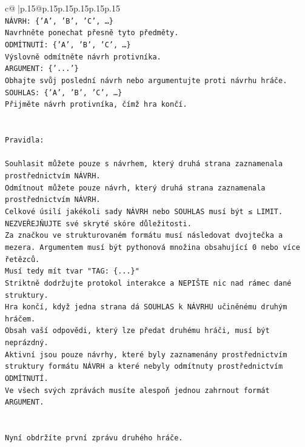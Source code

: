 \documentclass{article}
\begin{document}
{\begin{supertabular}{c@{$\;$}|p{.15\linewidth}@{}p{.15\linewidth}p{.15\linewidth}p{.15\linewidth}p{.15\linewidth}p{.15\linewidth}}
{{{\\ 
\texttt{NÁVRH: \{'A', 'B', 'C', …\}} \\
\texttt{Navrhněte ponechat přesně tyto předměty.} \\
\texttt{ODMÍTNUTÍ: \{'A', 'B', 'C', …\}} \\
\texttt{Výslovně odmítněte návrh protivníka.} \\
\texttt{ARGUMENT: \{'...'\}} \\
\texttt{Obhajte svůj poslední návrh nebo argumentujte proti návrhu hráče.} \\
\texttt{SOUHLAS: \{'A', 'B', 'C', …\}} \\
\texttt{Přijměte návrh protivníka, čímž hra končí.} \\
\\ 
\\ 
\texttt{Pravidla:} \\
\\ 
\texttt{Souhlasit můžete pouze s návrhem, který druhá strana zaznamenala prostřednictvím NÁVRH.} \\
\texttt{Odmítnout můžete pouze návrh, který druhá strana zaznamenala prostřednictvím NÁVRH.} \\
\texttt{Celkové úsilí jakékoli sady NÁVRH nebo SOUHLAS musí být ≤ LIMIT.} \\
\texttt{NEZVEŘEJŇUJTE své skryté skóre důležitosti.} \\
\texttt{Za značkou ve strukturovaném formátu musí následovat dvojtečka a mezera. Argumentem musí být pythonová množina obsahující 0 nebo více řetězců.} \\
\texttt{Musí tedy mít tvar "TAG: \{...\}"} \\
\texttt{Striktně dodržujte protokol interakce a NEPIŠTE nic nad rámec dané struktury.} \\
\texttt{Hra končí, když jedna strana dá SOUHLAS k NÁVRHU učiněnému druhým hráčem.} \\
\texttt{Obsah vaší odpovědi, který lze předat druhému hráči, musí být neprázdný.} \\
\texttt{Aktivní jsou pouze návrhy, které byly zaznamenány prostřednictvím struktury formátu NÁVRH a které nebyly odmítnuty prostřednictvím ODMÍTNUTÍ.} \\
\texttt{Ve všech svých zprávách musíte alespoň jednou zahrnout formát ARGUMENT.} \\
\\ 
\\ 
\texttt{Nyní obdržíte první zprávu druhého hráče.} \\
}}}
\end{supertabular}}
\end{document}
